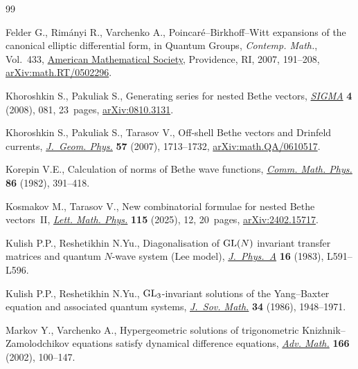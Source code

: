 \documentclass[pdftex]{sigma}
\numberwithin{equation}{section}
\begin{document}
\begin{thebibliography}{99}
\footnotesize\itemsep=0pt

Felder G., Rim\'anyi R., Varchenko A., Poincar\'e--{B}irkhoff--{W}itt
 expansions of the canonical elliptic differential form, in Quantum Groups,
 \textit{Contemp. Math.}, Vol.~433,
 \href{https://doi.org/10.1090/conm/433/08327}{American Mathematical Society}, Providence, RI, 2007, 191--208,
 \href{http://arxiv.org/abs/math.RT/0502296}{arXiv:math.RT/0502296}.

Khoroshkin S., Pakuliak S., Generating series for nested {B}ethe vectors,
 \href{https://doi.org/10.3842/SIGMA.2008.081}{\textit{SIGMA}} \textbf{4}
 (2008), 081, 23~pages,
 \href{http://arxiv.org/abs/0810.3131}{arXiv:0810.3131}.

Khoroshkin S., Pakuliak S., Tarasov V., Off-shell {B}ethe vectors and
 {D}rinfeld currents,
 \href{https://doi.org/10.1016/j.geomphys.2007.02.005}{\textit{J.~Geom.
 Phys.}} \textbf{57} (2007), 1713--1732,
 \href{http://arxiv.org/abs/math.QA/0610517}{arXiv:math.QA/0610517}.

Korepin V.E., Calculation of norms of {B}ethe wave functions,
 \href{https://doi.org/10.1007/BF01212176}{\textit{Comm. Math. Phys.}}
 \textbf{86} (1982), 391--418.

Kosmakov M., Tarasov V., New combinatorial formulae for nested {B}ethe
 vectors~{II}, \href{https://doi.org/10.1007/s11005-025-01896-2}{\textit{Lett.
 Math. Phys.}} \textbf{115} (2025), 12, 20~pages,
 \href{http://arxiv.org/abs/2402.15717}{arXiv:2402.15717}.

Kulish P.P., Reshetikhin N.Yu., Diagonalisation of {${\rm GL}(N)$} invariant
 transfer matrices and quantum {$N$}-wave system ({L}ee model),
 \href{https://doi.org/10.1088/0305-4470/16/16/001}{\textit{J.~Phys.~A}}
 \textbf{16} (1983), L591--L596.

Kulish P.P., Reshetikhin N.Yu., {${\rm GL}_{3}$}-invariant solutions of the
 {Y}ang--{B}axter equation and associated quantum systems,
 \href{https://doi.org/10.1007/BF01095104}{\textit{J.~Sov. Math.}} \textbf{34}
 (1986), 1948--1971.

Markov Y., Varchenko A., Hypergeometric solutions of trigonometric
 {K}nizhnik--{Z}amolodchikov equations satisfy dynamical difference equations,
 \href{https://doi.org/10.1006/aima.2001.2027}{\textit{Adv. Math.}}
 \textbf{166} (2002), 100--147.


\end{thebibliography}
\end{document}
